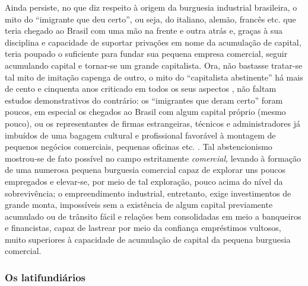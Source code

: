 Ainda persiste, no que diz respeito à origem da burguesia industrial brasileira, o mito do ``imigrante que deu certo'', ou seja, do italiano, alemão, francês etc. que teria chegado ao Brasil com uma mão na frente e outra atrás e, graças à sua disciplina e capacidade de suportar privações em nome da acumulação de capital, teria poupado o suficiente para fundar sua pequena empresa comercial, seguir acumulando capital e tornar-se um grande capitalista. Ora, não bastasse tratar-se tal mito de imitação capenga de outro, o mito do ``capitalista abstinente'' há mais de cento e cinquenta anos criticado em todos os seus aspectos \cite[pp.~689-697]{marx_capital1vol2_2001}, não faltam estudos demonstrativos do contrário: os ``imigrantes que deram certo'' foram poucos, em especial os chegados ao Brasil com algum capital próprio (mesmo pouco), ou os representantes de firmas estrangeiras, técnicos e administradores já imbuídos de uma bagagem cultural e profissional favorável à montagem de pequenos negócios comerciais, pequenas oficinas etc. \cite{dean_indussp_1971,gorender_burguesia_1990}. Tal abstencionismo mostrou-se de fato possível no campo estritamente \textit{comercial}, levando à formação de uma numerosa pequena burguesia comercial capaz de explorar uns poucos empregados e elevar-se, por meio de tal exploração, pouco acima do nível da sobrevivência; o empreendimento industrial, entretanto, exige investimentos de grande monta, impossíveis sem a existência de algum capital previamente acumulado ou de trânsito fácil e relações bem consolidadas em meio a banqueiros e financistas, capaz de lastrear por meio da confiança empréstimos vultosos, muito superiores à capacidade de acumulação de capital da pequena burguesia comercial.

\subsubsection{Os latifundiários}\label{subsubsec:clagraris}

